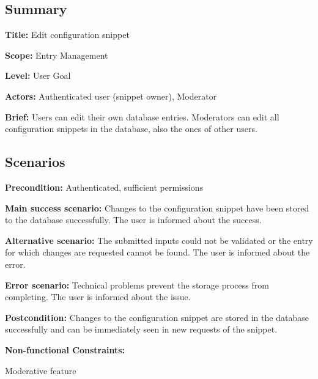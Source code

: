 \subsection*{Summary}


\begin{DoxyItemize}
\item {\bfseries Title\+:} Edit configuration snippet
\item {\bfseries Scope\+:} Entry Management
\item {\bfseries Level\+:} User Goal
\item {\bfseries Actors\+:} Authenticated user (snippet owner), Moderator
\item {\bfseries Brief\+:} Users can edit their own database entries. Moderators can edit all configuration snippets in the database, also the ones of other users.
\end{DoxyItemize}

\subsection*{Scenarios}


\begin{DoxyItemize}
\item {\bfseries Precondition\+:} Authenticated, sufficient permissions
\item {\bfseries Main success scenario\+:} Changes to the configuration snippet have been stored to the database successfully. The user is informed about the success.
\item {\bfseries Alternative scenario\+:} The submitted inputs could not be validated or the entry for which changes are requested cannot be found. The user is informed about the error.
\item {\bfseries Error scenario\+:} Technical problems prevent the storage process from completing. The user is informed about the issue.
\item {\bfseries Postcondition\+:} Changes to the configuration snippet are stored in the database successfully and can be immediately seen in new requests of the snippet.
\item {\bfseries Non-\/functional Constraints\+:}
\begin{DoxyItemize}
\item Moderative feature 
\end{DoxyItemize}
\end{DoxyItemize}